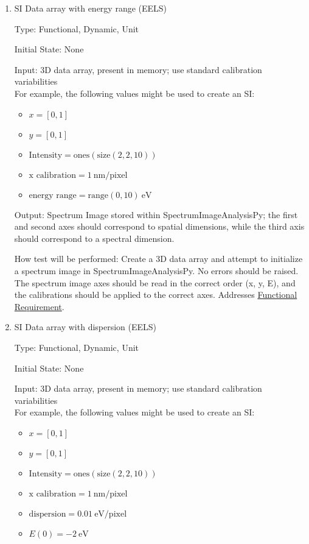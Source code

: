 \documentclass[12pt, titlepage]{article}
\newcommand{\progname}{SpectrumImageAnalysisPy}
\begin{document}
\begin{enumerate}

\item{SI Data array with energy range (EELS)}

Type: Functional, Dynamic, Unit

Initial State: None

Input: 3D data array, present in memory; use standard calibration variabilities\\
For example, the following values might be used to create an SI: 
\begin{itemize}
	\item $x = [0, 1]$
	\item $y = [0, 1]$
	\item $\text{Intensity} = \text{ones}(\text{size}(2,2,10))$
	\item $\text{x calibration} = 1\ \si{\nano\metre}/\text{pixel}$
	\item $\text{energy range} = \text{range}(0, 10)\ \si{\electronvolt}$
\end{itemize}

Output: Spectrum Image stored within \progname{}; the first and second axes should correspond to spatial dimensions, while the third axis should correspond to a spectral dimension.

How test will be performed: Create a 3D data array and attempt to initialize a spectrum image in \progname{}. No errors should be raised. The spectrum image axes should be read in the correct order (x, y, E), and the calibrations should be applied to the correct axes. Addresses \hyperref[R_SI_inputs]{Functional Requirement}.


\item{SI Data array with dispersion (EELS)}

Type: Functional, Dynamic, Unit

Initial State: None

Input: 3D data array, present in memory; use standard calibration variabilities\\
For example, the following values might be used to create an SI: 
\begin{itemize}
	\item $x = [0, 1]$
	\item $y = [0, 1]$
	\item $\text{Intensity} = \text{ones}(\text{size}(2,2,10))$
	\item $\text{x calibration} = 1\ \si{\nano\metre}/\text{pixel}$
	\item $\text{dispersion} = 0.01\ \si{\electronvolt}/\text{pixel}$
	\item $E(0) = -2\ \si{\electronvolt}$
\end{itemize}


\end{enumerate}
\end{document}
